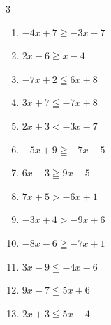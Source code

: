 \begin{multicols}{3}
\begin{enumerate}

  \item $-4x+7\geqq -3x-7$

        \phantom{$\displaystyle x\leqq 14$}

  \item $2x-6\geqq x-4$

        \phantom{$\displaystyle x\geqq 2$}

  \item $-7x+2\leqq 6x+8$


  \item $3x+7\leqq -7x+8$


  \item $2x+3<-3x-7$

        \phantom{$\displaystyle x<-2$}

  \item $-5x+9\geqq -7x-5$

        \phantom{$\displaystyle x\geqq -7$}

  \item $6x-3\geqq 9x-5$


  \item $7x+5>-6x+1$


\columnbreak %

  \item $-3x+4>-9x+6$


  \item $-8x-6\geqq -7x+1$

        \phantom{$\displaystyle x\leqq -7$}

  \item $3x-9\leqq -4x-6$


  \item $9x-7\leqq 5x+6$


  \item $2x+3\leqq 5x-4$


\end{enumerate}
\end{multicols}
